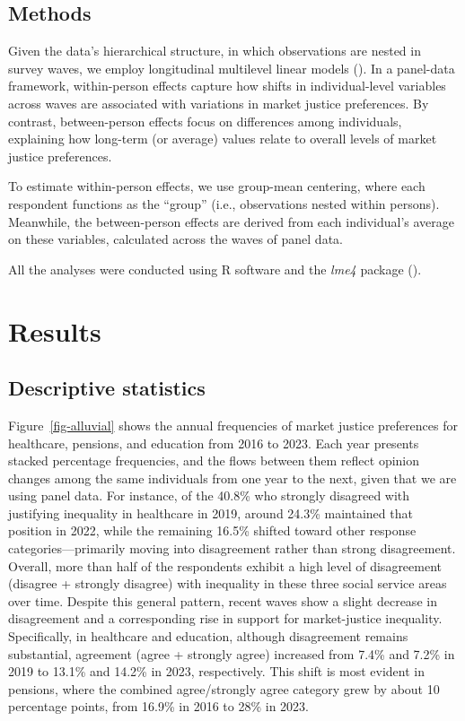 \documentclass[
  12pt,
]{article}
\begin{document}
\subsection{Methods}\label{methods}

Given the data's hierarchical structure, in which observations are
nested in survey waves, we employ longitudinal multilevel linear models
(). In a
panel-data framework, within-person effects capture how shifts in
individual-level variables across waves are associated with variations
in market justice preferences. By contrast, between-person effects focus
on differences among individuals, explaining how long-term (or average)
values relate to overall levels of market justice preferences.

To estimate within-person effects, we use group-mean centering, where
each respondent functions as the ``group'' (i.e., observations nested
within persons). Meanwhile, the between-person effects are derived from
each individual's average on these variables, calculated across the
waves of panel data.

All the analyses were conducted using R software and the \emph{lme4}
package ().

\section{Results}\label{results}

\subsection{Descriptive statistics}\label{descriptive-statistics}

Figure~\ref{fig-alluvial} shows the annual frequencies of market justice
preferences for healthcare, pensions, and education from 2016 to 2023.
Each year presents stacked percentage frequencies, and the flows between
them reflect opinion changes among the same individuals from one year to
the next, given that we are using panel data. For instance, of the
40.8\% who strongly disagreed with justifying inequality in healthcare
in 2019, around 24.3\% maintained that position in 2022, while the
remaining 16.5\% shifted toward other response categories---primarily
moving into disagreement rather than strong disagreement. Overall, more
than half of the respondents exhibit a high level of disagreement
(disagree + strongly disagree) with inequality in these three social
service areas over time. Despite this general pattern, recent waves show
a slight decrease in disagreement and a corresponding rise in support
for market-justice inequality. Specifically, in healthcare and
education, although disagreement remains substantial, agreement (agree +
strongly agree) increased from 7.4\% and 7.2\% in 2019 to 13.1\% and
14.2\% in 2023, respectively. This shift is most evident in pensions,
where the combined agree/strongly agree category grew by about 10
percentage points, from 16.9\% in 2016 to 28\% in 2023.
\end{document}
